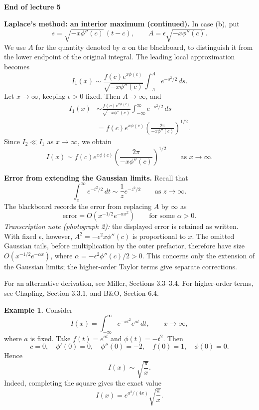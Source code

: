 \documentclass[11pt,a4paper]{article}
\begin{document}
\begin{center}
    \textbf{End of lecture 5}
\end{center}

\noindent\textbf{Laplace's method: an interior maximum (continued).}
In case (b), put
\[
    s=\sqrt{-x\phi''(c)}\,(t-c),\qquad
    A=\epsilon\sqrt{-x\phi''(c)}.
\]
We use $A$ for the quantity denoted by $a$ on the blackboard, to distinguish
it from the lower endpoint of the original integral. The leading local
approximation becomes
\[
    I_1(x)\sim\frac{f(c)e^{x\phi(c)}}{\sqrt{-x\phi''(c)}}
    \int_{-A}^{A}e^{-s^2/2}\,ds.
\]
Let $x\to\infty$, keeping $\epsilon>0$ fixed. Then $A\to\infty$, and
\begin{align*}
    I_1(x)&\sim\frac{f(c)e^{x\phi(c)}}{\sqrt{-x\phi''(c)}}
    \int_{-\infty}^{\infty}e^{-s^2/2}\,ds\\
    &=f(c)e^{x\phi(c)}\left(\frac{2\pi}{-x\phi''(c)}\right)^{1/2}.
\end{align*}
Since $I_2\ll I_1$ as $x\to\infty$, we obtain
\[
    \boxed{I(x)\sim f(c)e^{x\phi(c)}
    \left(\frac{2\pi}{-x\phi''(c)}\right)^{1/2}}
    \qquad\text{as }x\to\infty.
\]

\noindent\textbf{Error from extending the Gaussian limits.}
Recall that
\[
    \int_z^\infty e^{-t^2/2}\,dt
    \sim\frac{1}{z}e^{-z^2/2}
    \qquad\text{as }z\to\infty.
\]
The blackboard records the error from replacing $A$ by $\infty$ as
\[
    \text{error}=O\!\left(x^{-1/2}e^{-\alpha x^2}\right)
    \qquad\text{for some }\alpha>0.
\]
\emph{Transcription note (photograph 2):} the displayed error is retained
as written. With fixed $\epsilon$, however, $A^2=-\epsilon^2x\phi''(c)$
is proportional to $x$. The omitted Gaussian tails, before multiplication
by the outer prefactor, therefore have size
$O(x^{-1/2}e^{-\alpha x})$, where
$\alpha=-\epsilon^2\phi''(c)/2>0$. This concerns only the extension of the
Gaussian limits; the higher-order Taylor terms give separate corrections.

For an alternative derivation, see Miller, Sections 3.3--3.4.
For higher-order terms, see Chapling, Section 3.3.1, and B\&O, Section 6.4.

\medskip
\noindent\textbf{Example 1.}
Consider
\[
    I(x)=\int_{-\infty}^{\infty}e^{-xt^2}e^{at}\,dt,
    \qquad x\to\infty,
\]
where $a$ is fixed. Take $f(t)=e^{at}$ and $\phi(t)=-t^2$. Then
\[
    c=0,\quad \phi'(0)=0,\quad \phi''(0)=-2,\quad
    f(0)=1,\quad \phi(0)=0.
\]
Hence
\[
    I(x)\sim\sqrt{\frac{\pi}{x}}.
\]
Indeed, completing the square gives the exact value
\[
    I(x)=e^{a^2/(4x)}\sqrt{\frac{\pi}{x}}.
\]
\end{document}
